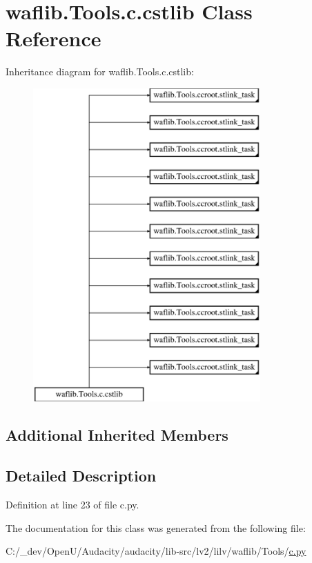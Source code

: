 \hypertarget{classwaflib_1_1_tools_1_1c_1_1cstlib}{}\section{waflib.\+Tools.\+c.\+cstlib Class Reference}
\label{classwaflib_1_1_tools_1_1c_1_1cstlib}
Inheritance diagram for waflib.\+Tools.\+c.\+cstlib\+:\begin{figure}[H]
\begin{center}
\leavevmode
\includegraphics[height=12.000000cm]{classwaflib_1_1_tools_1_1c_1_1cstlib}
\end{center}
\end{figure}
\subsection*{Additional Inherited Members}


\subsection{Detailed Description}


Definition at line 23 of file c.\+py.



The documentation for this class was generated from the following file\+:\begin{DoxyCompactItemize}
\item 
C\+:/\+\_\+dev/\+Open\+U/\+Audacity/audacity/lib-\/src/lv2/lilv/waflib/\+Tools/\hyperlink{lilv_2waflib_2_tools_2c_8py}{c.\+py}\end{DoxyCompactItemize}
